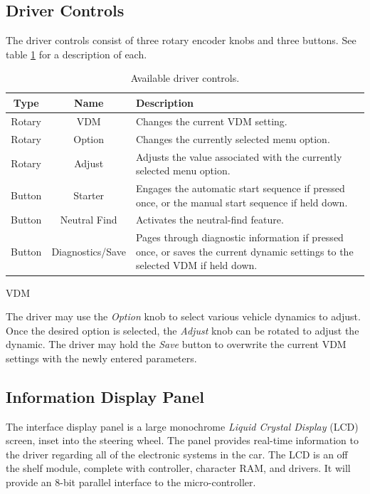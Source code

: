 \subsection{Driver Controls}

The driver controls consist of three rotary encoder knobs and three buttons. See table \ref{table:driver_controls} for a description of each.

\begin{table}[H]
	\caption{Available driver controls.\label{table:driver_controls}}
	\centering
	\begin{tabular}{|c|c|p{8 cm}|}
		\hline 
		Type & Name & Description \\
		\hline
		\hline 
		Rotary & VDM & Changes the current VDM setting. \\
		\hline 
		Rotary & Option & Changes the currently selected menu option. \\
		\hline
		Rotary & Adjust & Adjusts the value associated with the currently selected menu option. \\
		\hline
		Button & Starter & Engages the automatic start sequence if pressed once, or the manual start sequence if held down.\\
		\hline
		Button & Neutral Find & Activates the neutral-find feature. \\
		\hline
		Button & Diagnostics/Save & Pages through diagnostic information if pressed once, or saves the current dynamic settings to the selected VDM if held down.\\		
		\hline 		
	\end{tabular}
\end{table}

\begin{description}
	\item[VDM] 

\end{description}

The driver may use the \emph{Option} knob to select various vehicle dynamics to adjust. Once the desired option is selected, the \emph{Adjust} knob can be rotated to adjust the dynamic. The driver may hold the \emph{Save} button to overwrite the current VDM settings with the newly entered parameters. 

\subsection{Information Display Panel}

The interface display panel is a large monochrome \emph{Liquid Crystal Display} (LCD) screen, inset into the steering wheel. The panel provides real-time information to the driver regarding all of the electronic systems in the car. The LCD is an off the shelf module, complete with controller, character RAM, and drivers. It will provide an 8-bit parallel interface to the micro-controller. 

